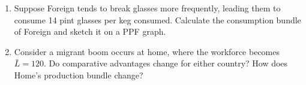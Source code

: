 \documentclass[12pt]{article}
\begin{document}
\begin{enumerate}[1)]
	\bigskip
	
	\bigskip
	
	\bigskip
	
	\bigskip
	
	\bigskip
	
	\bigskip  
	
	
	\newpage
	
	\item Suppose Foreign tends to break glasses more frequently, leading them to consume 14 pint glasses per keg consumed. Calculate the consumption bundle of Foreign and sketch it on a PPF graph. 
	
	\vspace{2in}
	
	\item Consider a migrant boom occurs at home, where the workforce becomes $\bar{L}=120$. Do comparative advantages change for either country?
	How does Home's production bundle change?
	
	\vspace{4in}
	
\end{enumerate}
\end{document}
